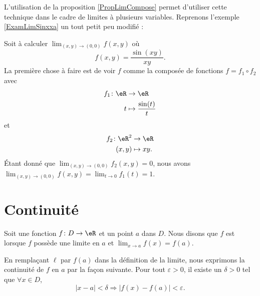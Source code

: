 L'utilisation de la proposition \ref{PropLimCompose} permet d'utiliser cette technique dans le cadre de limites à plusieurs variables. Reprenons l'exemple \ref{ExamLimSinxxa} un tout petit peu modifié :
\begin{example}
	Soit à calculer $\lim_{(x,y)\to(0,0)}f(x,y)$ où
	\begin{equation}
		f(x,y)=\frac{ \sin(xy) }{ xy }.
	\end{equation}
	La première chose à faire est de voir $f$ comme la composée de fonctions $f=f_1\circ f_2$ avec
	\begin{equation}
		\begin{aligned}
			f_1\colon \eR&\to \eR \\
			t&\mapsto \frac{ \sin(t) }{ t } 
		\end{aligned}
	\end{equation}
	et
	\begin{equation}
		\begin{aligned}
			f_2\colon \eR^2&\to \eR \\
			(x,y)&\mapsto xy. 
		\end{aligned}
	\end{equation}
	 Étant donné que $\lim_{(x,y)\to(0,0)}f_2(x,y)=0$, nous avons $\lim_{(x,y)\to(0,0)}f(x,y)=\lim_{t\to 0} f_1(t)=1$.
\end{example}

\section{Continuité}
\label{SecContinue}

\begin{definition}		\label{DefFonctContinueRR}
	Soit une fonction $f\colon D\to \eR$ et un point $a$ dans $D$. Nous disons que $f$ est  lorsque $f$ possède une limite en $a$ et $\lim_{x\to a} f(x)=f(a)$.
\end{definition}
En remplaçant $\ell$ par $f(a)$ dans la définition de la limite, nous exprimons la continuité de $f$ en $a$ par la façon suivante. Pour tout $\varepsilon>0$, il existe un $\delta>0$ tel que $\forall x\in D$,
\begin{equation}
	| x-a |<\delta\Rightarrow \big| f(x)-f(a) \big|<\varepsilon.
\end{equation}

